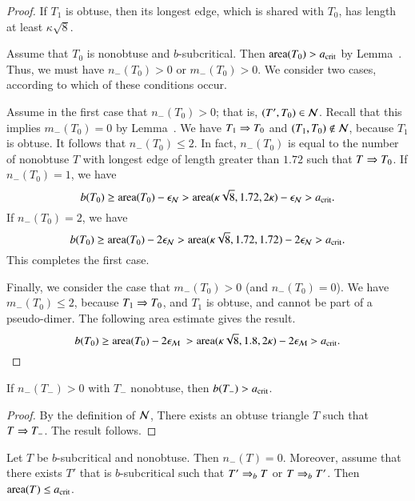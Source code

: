 \begin{proof} 
  If $T_1$ is obtuse, then its longest edge, which is shared with
  $T_0$, has length at least $\kappa\sqrt8$.

  Assume that $T_0$ is nonobtuse and $b$-subcritical.  Then
  ${\operatorname{area}}(T_0) > a_\text{crit}$ by Lemma~.  Thus, we must
  have $n_-(T_0)>0$ or $m_-(T_0)>0$.  We consider two cases, according
  to which of these conditions occur.

  Assume in the first case that $n_-(T_0)>0$; that is, $(T',T_0)\in
  \mathcal N$.  Recall that this implies $m_-(T_0)=0$ by
  Lemma~.  We have $T_1\Rightarrow T_0$ and $(T_1,T_0)\not\in
  \mathcal N$, because $T_1$ is obtuse.  It follows that $n_-(T_0)\le 2$.  In
  fact, $n_-(T_0)$ is equal to the number of nonobtuse $T$ with
  longest edge of length greater than $1.72$ such that $T\Rightarrow T_0$.  If
  $n_-(T_0)=1$, we have
  \[
b(T_0) \ge {\operatorname{area}}(T_0) - \epsilon_{\mathcal N} 
> {\operatorname{area}}(\kappa\sqrt8,1.72,2\kappa)  - \epsilon_{\mathcal N} > a_\text{crit}.
\]
If $n_-(T_0)=2$, we have
  \[
b(T_0) \ge {\operatorname{area}}(T_0) - 2\epsilon_{\mathcal N} 
> {\operatorname{area}}(\kappa\sqrt8,1.72,1.72)  - 2\epsilon_{\mathcal N} > a_\text{crit}.
\]
  This completes the first case.

  Finally, we consider the case that $m_-(T_0)>0$ (and $n_-(T_0)=0$).
  We have $m_-(T_0)\le 2$, because $T_1\Rightarrow T_0$, and $T_1$ is obtuse,
  and cannot be part of a pseudo-dimer.  The following area estimate
  gives the result.
\[
  b(T_0) \ge \area(T_0) - 2\epsM\ 
  > \area(\kappa\sqrt8,1.8,2\kappa) -
  2\epsM > \acrit.
\]
\end{proof}

\begin{corollary} 
  If $n_-(T_-)>0$ with $T_-$ nonobtuse, then $b(T_-) > a_\text{crit}$.
\end{corollary}  

\begin{proof}  
  By the definition of $\mathcal N$, There exists an obtuse triangle $T$ such
  that $T\Rightarrow T_-$.  The result follows.
\end{proof}

\begin{lemma}  
  Let $T$ be $b$-subcritical and nonobtuse.  Then $n_-(T)=0$.
  Moreover, assume that there exists $T'$ that is $b$-subcritical such
  that $T'\Rightarrow_{b} T$ or $T\Rightarrow_{b} T'$.  Then ${\operatorname{area}}(T)\le a_\text{crit}$.
\end{lemma}

